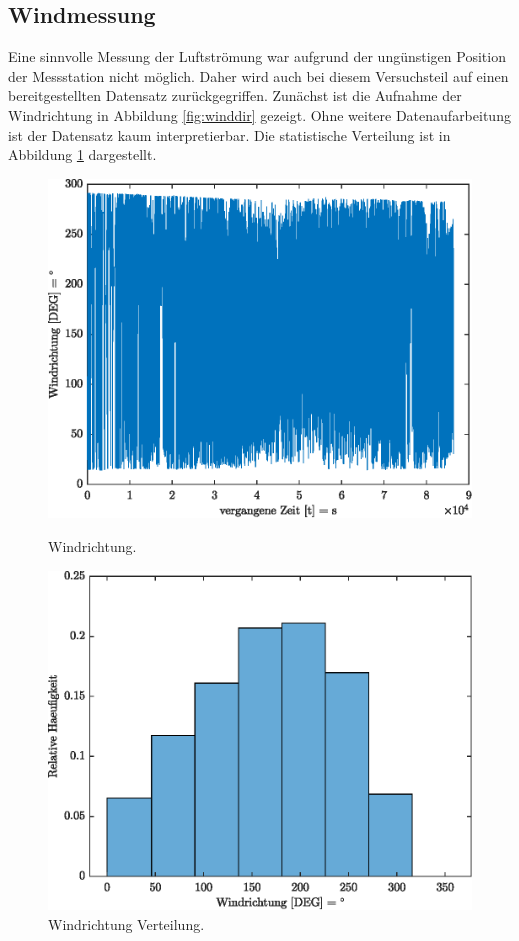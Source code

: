 \subsection{Windmessung}
Eine sinnvolle Messung der Luftströmung war aufgrund der ungünstigen Position der Messstation nicht möglich. Daher wird auch bei diesem Versuchsteil auf einen bereitgestellten Datensatz zurückgegriffen. Zunächst ist die Aufnahme der Windrichtung in Abbildung \ref{fig:winddir} gezeigt. Ohne weitere Datenaufarbeitung ist der Datensatz kaum interpretierbar. Die statistische Verteilung ist in Abbildung \ref{fig:winddirCN} dargestellt.
\begin{figure}[H]
	\centering
	\begin{minipage}[t]{0.4\textwidth}
		\centering
		\includegraphics[width=\textwidth]{../DATA/Windrichtung.eps}
		\caption[Windrichtung]{Windrichtung.}
		\label{fig:winddir}
	\end{minipage}
	\hfill
	\begin{minipage}[t]{0.4\textwidth}
		\centering
		\centering
		\includegraphics[width=\textwidth]{../DATA/WinddirCN.eps}
		\caption[Windrichtung Verteilung]{Windrichtung Verteilung.}
		\label{fig:winddirCN}
	\end{minipage}
\end{figure}

